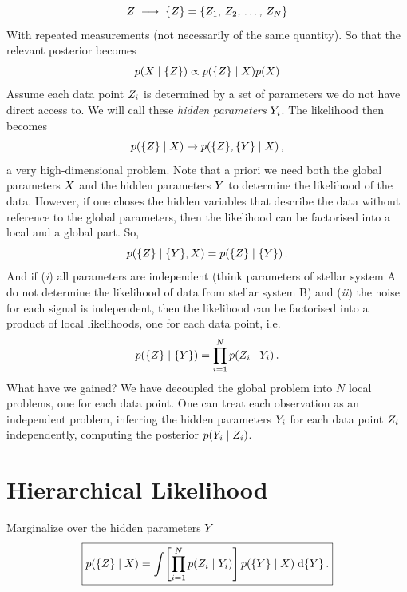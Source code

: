 \documentclass[12pt,a4paper]{article}
\begin{document}
\[
  Z \;\longrightarrow\; \{Z\} = \{Z_1,\, Z_2,\, \ldots,\, Z_N\}
\]
With repeated measurements (not necessarily of the same quantity). 
%
So that the relevant posterior becomes
\[
  p(X\mid\{Z\}) \propto p(\{Z\}\mid X) p(X)
\]
Assume each data point $Z_i$ is determined by a set of parameters we do not have direct access to. 
We will call these \emph{hidden parameters} $Y_{i}$.
The likelihood then becomes
\[
    p(\{Z\}\mid X) \rightarrow p(\{Z\}, \{Y\}\mid X)
    \,,
\]
a very high-dimensional problem.
Note that a priori we need both the global parameters $X$ and the hidden parameters $Y$ to determine the likelihood of the data.
However, if one choses the hidden variables that describe the data without reference to the global parameters, then the likelihood can be factorised into a local and a global part. 
So, 
\[
    p(\{Z\} \mid \{Y\}, X) = p(\{Z\} \mid \{Y\})
    \,.
\]
And if (\textit{i}) all parameters are independent (think parameters of stellar system A do not determine the likelihood of data from stellar system B) and (\textit{ii}) the noise for each signal is independent, then the likelihood can be factorised into a product of local likelihoods, one for each data point, i.e.
\[
    p(\{Z\} \mid \{Y\}) = \prod_{i=1}^{N} p(Z_i \mid Y_{i})
    \,.
\]
What have we gained? We have decoupled the global problem into $N$ local problems, one for each data point.
One can treat each observation as an independent problem, inferring the hidden parameters $Y_{i}$ for each data point $Z_i$ independently, computing the posterior $p(Y_{i} \mid Z_i)$.




    

\section{Hierarchical Likelihood}

Marginalize over the hidden parameters $Y$
\[
  \boxed{
    p\!\left(\{Z\}\mid X\right)
    = \int\!\left[\prod_{i=1}^{N} p\!\left(Z_i\mid Y_{i}\right)\right]
      p(\{Y \}\mid X)\;\mathrm{d}\{Y\}
      \,.
  }
\]
\end{document}
